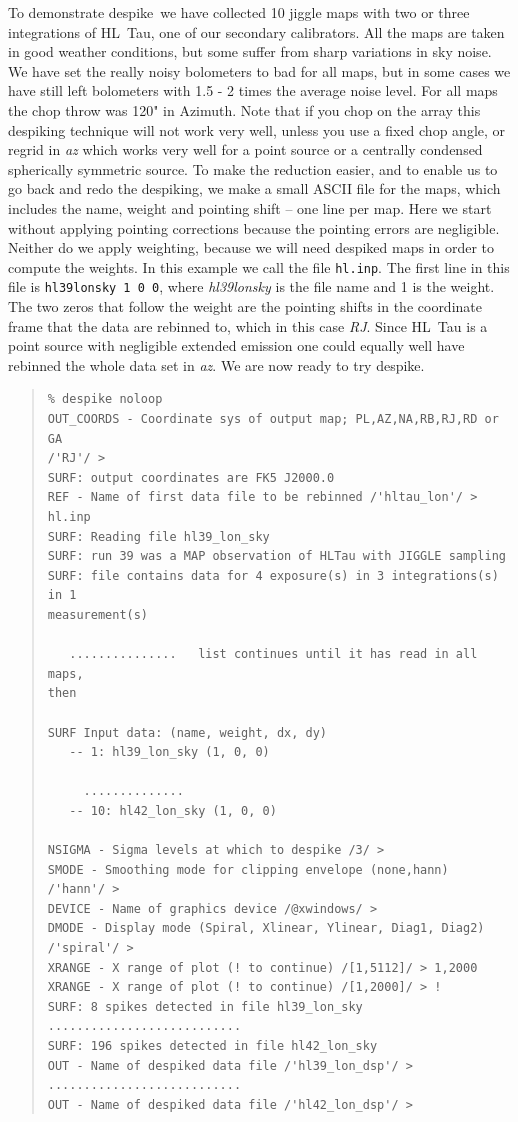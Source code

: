 \documentclass[twoside,11pt]{article}
\newenvironment{myquote}{\begin{quote}\begin{small}}{\end{small}\end{quote}}
\newcommand{\task}[1]{\textsf{#1}}
\newcommand{\desp}{\xref{\task{despike}}{sun216}{DESPIKE}}
\newcommand{\xref}[3]{#1}
\renewcommand{\_}{\texttt{\symbol{95}}}
\begin{document}
To demonstrate \desp\ we have collected 10 jiggle maps with two or
three integrations of HL~Tau, one of our secondary calibrators.  All
the maps are taken in good weather conditions, but some suffer from
sharp variations in sky noise. We have set the really noisy bolometers
to bad for all maps, but in some cases we have still left bolometers
with 1.5 - 2 times the average noise level.  For all maps the chop
throw was 120" in Azimuth.  Note that if you chop on the array this
despiking technique will not work very well, unless you use a fixed
chop angle, or regrid in {\it az} which works very well for a point
source or a centrally condensed spherically symmetric source. To make
the reduction easier, and to enable us to go back and redo the
despiking, we make a small ASCII file for the maps, which includes the
name, weight and pointing shift -- one line per map.  Here we start
without applying pointing corrections because the pointing errors are
negligible.  Neither do we apply weighting, because we will need
despiked maps in order to compute the weights.  In this example we
call the file \texttt{hl.inp}.  The first line in this file is
\texttt{hl39\_lon\_sky 1 0 0}, where {\it hl39\_lon\_sky} is the file
name and 1 is the weight.  The two zeros that follow the weight are
the pointing shifts in the coordinate frame that the data are rebinned
to, which in this case {\it RJ}. Since HL~Tau is a point source with
negligible extended emission one could equally well have rebinned the
whole data set in {\it az}. We are now ready to try \desp.

\begin{myquote}
\begin{verbatim}
% despike noloop
OUT_COORDS - Coordinate sys of output map; PL,AZ,NA,RB,RJ,RD or GA
/'RJ'/ >
SURF: output coordinates are FK5 J2000.0
REF - Name of first data file to be rebinned /'hltau_lon'/ > hl.inp
SURF: Reading file hl39_lon_sky
SURF: run 39 was a MAP observation of HLTau with JIGGLE sampling
SURF: file contains data for 4 exposure(s) in 3 integrations(s) in 1
measurement(s)

   ...............   list continues until it has read in all maps,
then

SURF Input data: (name, weight, dx, dy)
   -- 1: hl39_lon_sky (1, 0, 0)

     ..............
   -- 10: hl42_lon_sky (1, 0, 0)

NSIGMA - Sigma levels at which to despike /3/ >
SMODE - Smoothing mode for clipping envelope (none,hann) /'hann'/ >
DEVICE - Name of graphics device /@xwindows/ >
DMODE - Display mode (Spiral, Xlinear, Ylinear, Diag1, Diag2)
/'spiral'/ >
XRANGE - X range of plot (! to continue) /[1,5112]/ > 1,2000
XRANGE - X range of plot (! to continue) /[1,2000]/ > !
SURF: 8 spikes detected in file hl39_lon_sky
...........................
SURF: 196 spikes detected in file hl42_lon_sky
OUT - Name of despiked data file /'hl39_lon_dsp'/ >
...........................
OUT - Name of despiked data file /'hl42_lon_dsp'/ >
\end{verbatim}
\end{myquote}
\end{document}
